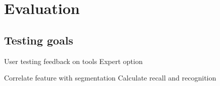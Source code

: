 \chapter{Evaluation} \label{ch5}

\section{Testing goals}

User testing feedback on tools
Expert option

Correlate feature with segmentation
Calculate recall and recognition

\cite{}